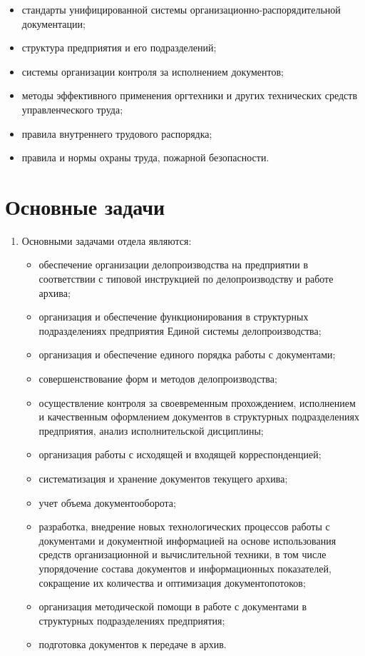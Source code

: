 \documentclass[a4paper,12pt]{article}
\begin{document}
\begin{enumerate}
\begin{itemize}
	\item стандарты унифицированной системы организационно-распорядительной документации;
	\item структура предприятия и его подразделений;
	\item системы организации контроля за исполнением документов;
	\item методы эффективного применения оргтехники и других технических средств управленческого труда;
	\item правила внутреннего трудового распорядка;
	\item правила и нормы охраны труда, пожарной безопасности.
\end{itemize}
\end{enumerate}

\section{Основные задачи}
\begin{enumerate}
	\item Основными задачами отдела являются:
	\begin{itemize}
		\item обеспечение организации делопроизводства на предприятии в соответствии с типовой инструкцией по делопроизводству и работе архива;
		\item организация и обеспечение функционирования в структурных подразделениях предприятия Единой системы делопроизводства;
		\item организация и обеспечение единого порядка работы с документами;
		\item совершенствование форм и методов делопроизводства;
		\item осуществление контроля за своевременным прохождением, исполнением и качественным оформлением документов в структурных подразделениях предприятия, анализ исполнительской дисциплины;
		\item организация работы с исходящей и входящей корреспонденцией;
		\item систематизация и хранение документов текущего архива;
		\item учет объема документооборота;
		\item разработка, внедрение новых технологических процессов работы с документами и документной информацией на основе использования средств организационной и вычислительной техники, в том числе упорядочение состава документов и информационных показателей, сокращение их количества и оптимизация документопотоков;
		\item организация методической помощи в работе с документами в структурных подразделениях предприятия;
		\item подготовка документов к передаче в архив.
	\end{itemize}
\end{enumerate}
\end{document}
